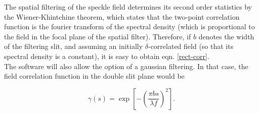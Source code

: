 The spatial filtering of the speckle field determines its second order statistics by the Wiener-Khintchine theorem, which states that the two-point correlation 
function is the fourier transform of the spectral density (which is proportional to the field in the focal plane of the spatial filter). Therefore, if $b$ denotes 
the width of the filtering slit, and assuming an initially $\delta$-correlated field (so that its spectral density is a constant), it is easy to obtain eqn. 
\eqref{rect-corr}. \\

The software will also allow the option of a gaussian filtering. In that case, the field correlation function in the double slit plane would be 

\begin{equation}
    \gamma(s) = \exp\left[-\left(\frac{\pi bs}{\lambda f}\right)^2\right].
\end{equation}